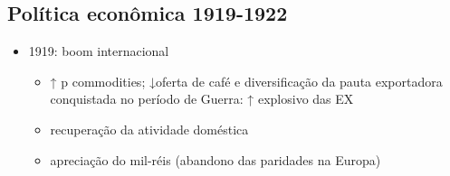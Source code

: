 \documentclass[a4paper,12pt]{article}[abntex2]
\begin{document}
\subsection{\textbf{Política econômica 1919-1922}}
\begin{itemize}
    \item 1919: boom internacional
    \begin{itemize}
        \item ↑ p commodities; ↓oferta de café e diversificação da pauta exportadora conquistada no período de Guerra: ↑ explosivo das EX
    \end{itemize}
\begin{itemize}
    \item recuperação da atividade doméstica
\end{itemize}
\begin{itemize}
    \item apreciação do mil-réis (abandono das paridades na Europa)
\end{itemize}


\end{itemize}
\end{document}

